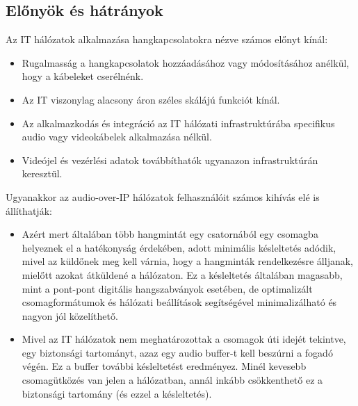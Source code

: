 \subsection{Előnyök és hátrányok}
Az IT hálózatok alkalmazása hangkapcsolatokra nézve számos előnyt kínál:
\begin{itemize}
	\item Rugalmasság a hangkapcsolatok hozzáadásához vagy módosításához anélkül,
	      hogy a kábeleket cserélnénk.
\end{itemize}
\begin{itemize}
	\item Az IT viszonylag alacsony áron széles skálájú funkciót kínál.
\end{itemize}
\begin{itemize}
	\item Az alkalmazkodás és integráció az IT hálózati infrastruktúrába
	      specifikus audio vagy videokábelek alkalmazása nélkül.
\end{itemize}
\begin{itemize}
	\item Videójel és vezérlési adatok továbbíthatók ugyanazon infrastruktúrán
	      keresztül.
\end{itemize}
Ugyanakkor az audio-over-IP hálózatok felhasználóit számos kihívás elé is állíthatják:
\begin{itemize}
	\item Azért mert általában több hangmintát egy csatornából egy csomagba helyeznek
	      el a hatékonyság érdekében, adott minimális késleltetés adódik, mivel az
	      küldőnek meg kell várnia, hogy a hangminták rendelkezésre álljanak, mielőtt
	      azokat átküldené a hálózaton. Ez a késleltetés általában magasabb, mint a
	      pont-pont digitális hangszabványok esetében, de optimalizált csomagformátumok és
	      hálózati beállítások segítségével minimalizálható és nagyon jól közelíthető.
\end{itemize}
\begin{itemize}
	\item Mivel az IT hálózatok nem meghatározottak a csomagok úti idejét tekintve,
	      egy biztonsági tartományt, azaz egy audio buffer-t kell beszúrni a fogadó végén.
	      Ez a buffer további késleltetést eredményez. Minél kevesebb csomagütközés van
	      jelen a hálózatban, annál inkább csökkenthető ez a biztonsági tartomány (és
	      ezzel a késleltetés).
\end{itemize}
